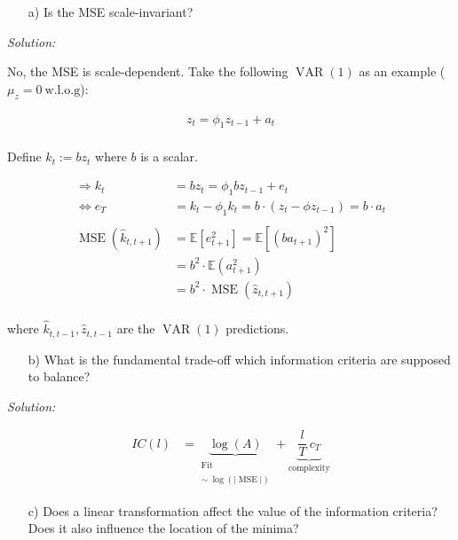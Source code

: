 \documentclass[12pt,a4paper]{article}
\newcommand{\MSE}{\operatorname{MSE}} %
\newcommand{\VAR}{\operatorname{VAR}} %
\begin{document}
\begin{itemize}
  \item[a)] Is the MSE scale-invariant? 
\end{itemize}

\emph{Solution:}

No, the MSE is scale-dependent. Take the following \(\VAR(1)\) as an
example (\(\mu_z = 0 \ \text{w.l.o.g}\)):

\begin{align*}
z_t =  \phi_1 z_{t-1} + a_t\\
\end{align*}

Define \(k_t := b z_t\) where \(b\) is a scalar.

\begin{align*}
  \Rightarrow k_t & = b z_t = \phi_1 b z_{t-1} + e_t \\
  \Leftrightarrow e_T & = k_t - \phi_1 k_t = b \cdot \left(z_t - \phi z_{t-1} \right) = b \cdot a_t\\
  \\
  \MSE(\hat{k}_{t, t+1} ) & = \mathbb{E} \left[ e_{t+1}^{2}\right] = \mathbb{E} \left[ (b a_{t+1})^{2}\right] \\
   & = b^2 \cdot \mathbb{E} \left( a_{t+1}^{2}\right)\\
   & = b^2 \cdot  \MSE(\hat{z}_{t, t+1} )\\
\end{align*}

where \(\hat{k}_{t, t-1}, \hat{z}_{t, t-1}\) are the \(\VAR (1)\)
predictions.

\begin{itemize}
  \item[b)] What is the fundamental trade-off which information criteria are supposed to balance? 
\end{itemize}

\emph{Solution:}

\begin{align*}
  IC (l) & = \underbrace{\log \left( A \right)}_{\substack{\text{Fit} \\ \\  \sim \ \log(|\MSE|)}} + \underbrace{\dfrac{l}{T} \ c_T}_{\text{complexity}}
\end{align*}

\begin{itemize}
  \item[c)] Does a linear transformation affect the value of the information criteria? Does it also influence the location of the minima?  
\end{itemize}
\end{document}
